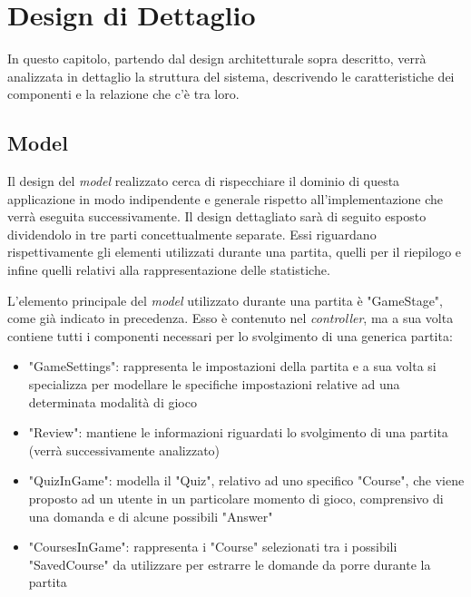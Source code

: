 \chapter{Design di Dettaglio}\label{chap:design}
In questo capitolo, partendo dal design architetturale sopra descritto, verrà analizzata in dettaglio la struttura del sistema, descrivendo le caratteristiche dei componenti e la relazione che c'è tra loro.

    \section{Model}
        Il design del \textit{model} realizzato cerca di rispecchiare il dominio di questa applicazione in modo indipendente e generale rispetto all'implementazione che verrà eseguita successivamente. Il design dettagliato sarà di seguito esposto dividendolo in tre parti concettualmente separate. Essi riguardano rispettivamente gli elementi utilizzati durante una partita, quelli per il riepilogo e infine quelli relativi alla rappresentazione delle statistiche.
        
        \medskip
        L'elemento principale del \textit{model} utilizzato durante una partita è "GameStage", come già indicato in precedenza. Esso è contenuto nel \textit{controller}, ma a sua volta contiene tutti i componenti necessari per lo svolgimento di una generica partita:
        \begin{itemize}
            \item "GameSettings": rappresenta le impostazioni della partita e a sua volta si specializza per modellare le specifiche impostazioni relative ad una determinata modalità di gioco
            \item "Review": mantiene le informazioni riguardati lo svolgimento di una partita (verrà successivamente analizzato)
            \item "QuizInGame": modella il "Quiz", relativo ad uno specifico "Course", che viene proposto ad un utente in un particolare momento di gioco, comprensivo di una domanda e di alcune possibili "Answer"
            \item "CoursesInGame": rappresenta i "Course" selezionati tra i possibili "SavedCourse" da utilizzare per estrarre le domande da porre durante la partita
        \end{itemize}

